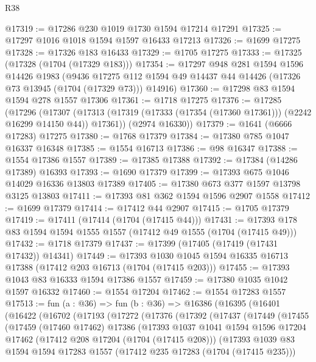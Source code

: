 \begin{lexlean}{R38}
\begin{coremodule}
@17319 := @17286 @230 @1019 @1730 @1594 @17214 @17291
@17325 := @17297 @1016 @1018 @1594 @1597 @16433 @17213
@17326 := @1699 @17275
@17328 := @17326 @183 @16433
@17329 := @1705 @17275
@17333 := @17325 (@17328 (@1704 (@17329 @183)))
@17354 := @17297
    @948
    @281
    @1594
    @1596
    @14426
    @1983
    (@9436 @17275 @112 @1594 @49 @14437 @44 @14426 (@17326 @73 @13945 (@1704 (@17329 @73))) @14916)
@17360 := @17298 @83 @1594 @1594 @278 @1557 @17306
@17361 := @1718 @17275
@17376 := @17285
    (@17296
      (@17307 (@17313 (@17319 (@17333 (@17354 (@17360 @17361))) (@2242 @16299 @14150 @44)) @17361))
      (@2974 @16330))
@17379 := @1641 (@6666 @17283) @17275
@17380 := @1768 @17379
@17384 := @17380 @785 @1047 @16337 @16348
@17385 := @1554 @16713
@17386 := @98 @16347
@17388 := @1554 @17386 @1557
@17389 := @17385 @17388
@17392 := @17384 (@14286 @17389) @16393
@17393 := @1690 @17379
@17399 := @17393 @675 @1046 @14029 @16336 @13803 @17389
@17405 := @17380 @673 @377 @1597 @13798 @3125 @13803
@17411 := @17393 @81 @362 @1594 @1596 @2907 @1558
@17412 := @1699 @17379
@17414 := @17412 @44 @2907
@17415 := @1705 @17379
@17419 := @17411 (@17414 (@1704 (@17415 @44)))
@17431 := @17393 @178 @83 @1594 @1594 @1555 @1557 (@17412 @49 @1555 (@1704 (@17415 @49)))
@17432 := @1718 @17379
@17437 := @17399 (@17405 (@17419 (@17431 @17432)) @14341)
@17449 := @17393 @1030 @1045 @1594 @16335 @16713 @17388 (@17412 @203 @16713 (@1704 (@17415 @203)))
@17455 := @17393 @1043 @83 @16333 @1594 @17386 @1557
@17459 := @17380 @1035 @1042 @1597 @16332
@17460 := @1554 @17204
@17462 := @1554 @17283 @1557
@17513 := fun (a : @36) =>
  fun (b : @36) =>
  @16386
    (@16395
      (@16401
        (@16422
          (@16702
            (@17193
              (@17272
                (@17376
                  (@17392
                    (@17437
                      (@17449
                        (@17455
                          (@17459
                            (@17460 @17462)
                            @17386
                            (@17393
                              @1037
                              @1041
                              @1594
                              @1596
                              @17204
                              @17462
                              (@17412 @208 @17204 (@1704 (@17415 @208)))
                              (@17393
                                @1039
                                @83
                                @1594
                                @1594
                                @17283
                                @1557
                                (@17412 @235 @17283 (@1704 (@17415 @235)))

\end{coremodule}
\end{lexlean}
